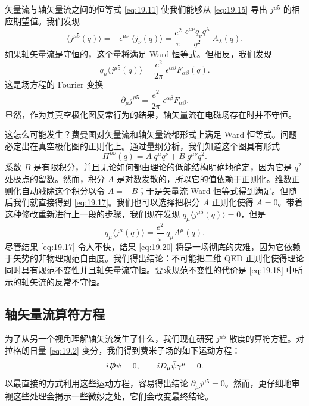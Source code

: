 矢量流与轴矢量流之间的恒等式 \eqref{eq:19.11} 使我们能够从 \eqref{eq:19.15} 导出 $j^{\mu 5}$ 的相应期望值。我们发现
\begin{equation}
  \langle j^{\mu 5}(q)\rangle = -\epsilon^{\mu\nu}\ \langle j_\nu(q)\rangle
  = \frac{e^2}{\pi}\ \frac{\epsilon^{\mu\nu}q_\nu q^\lambda}{q^2}\ A_\lambda(q)
  .
  \label{eq:19.16}
\end{equation}
如果轴矢量流是守恒的，这个量将满足 Ward 恒等式。但相反，我们发现
\begin{equation}
  q_\mu\langle j^{\mu 5}(q)\rangle = \frac{e^2}{2\pi}\ \epsilon^{\alpha\beta}
    F_{\alpha\beta}(q) .
  \label{eq:19.17}
\end{equation}
这是场方程的 Fourier 变换
\begin{equation}
  \partial_\mu j^{\mu 5} = \frac{e^2}{2\pi}\ \epsilon^{\alpha\beta}F_{\alpha\beta}
  .
  \label{eq:19.18}
\end{equation}
显然，作为其真空极化图反常行为的结果，轴矢量流在电磁场存在时并不守恒。

这怎么可能发生？费曼图对矢量流和轴矢量流都形式上满足 Ward 恒等式。问题必定出在真空极化图的正则化上。通过量纲分析，我们知道这个图具有形式
\begin{equation}
  \Pi^{\mu\nu}(q) = A\ q^\mu q^\nu + B\ g^{\mu\nu}q^2 .
  \label{eq:19.19}
\end{equation}
系数 $B$ 是有限积分，并且无论如何都由理论的低能结构明确地确定，因为它是 $q^2$ 处极点的留数。然而，积分 $A$ 是对数发散的，所以它的值依赖于正则化。维数正则化自动减除这个积分以令 $A = -B$；于是矢量流 Ward 恒等式得到满足。但随后我们就直接得到 \eqref{eq:19.17}。我们也可以选择把积分 $A$ 正则化使得 $A = 0$。带着这种修改重新进行上一段的步骤，我们现在发现 $q_\mu\langle j^{\mu 5}(q)\rangle = 0$，但是
\begin{equation}
  q_\mu\langle j^\mu(q)\rangle = \frac{e^2}{\pi}\ q_\mu A^\mu(q) .
  \label{eq:19.20}
\end{equation}
尽管结果 \eqref{eq:19.17} 令人不快，结果 \eqref{eq:19.20} 将是一场彻底的灾难，因为它依赖于矢势的非物理规范自由度。我们得出结论：不可能把二维 QED 正则化使得理论同时具有规范不变性并且轴矢量流守恒。要求规范不变性的代价是 \eqref{eq:19.18} 中所示的轴矢流的反常不守恒。

\subsection{轴矢量流算符方程}

为了从另一个视角理解轴矢流发生了什么，我们现在研究 $j^{\mu 5}$ 散度的算符方程。对拉格朗日量 \eqref{eq:19.2} 变分，我们得到费米子场的如下运动方程：
\begin{equation}
  i\slashed{D}\psi = 0,\qquad iD_\mu\bar{\psi}\gamma^\mu = 0 .
  \label{eq:19.21}
\end{equation}
以最直接的方式利用这些运动方程，容易得出结论 $\partial_\mu j^{\mu 5} = 0$。然而，更仔细地审视这些处理会揭示一些微妙之处，它们会改变最终结论。

